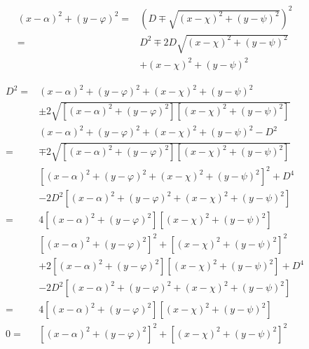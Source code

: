 \documentclass[
]{book}
\theoremstyle{definition}
\theoremstyle{definition}
\theoremstyle{definition}
\theoremstyle{definition}
\theoremstyle{remark}
\begin{document}
\[
\begin{aligned}
\left(x-\alpha\right)^{2}+\left(y-\varphi\right)^{2}= & \left(D\mp\sqrt{\left(x-\chi\right)^{2}+\left(y-\psi\right)^{2}}\right)^{2}\\
= & D^{2}\mp2D\sqrt{\left(x-\chi\right)^{2}+\left(y-\psi\right)^{2}}\\
 & +\left(x-\chi\right)^{2}+\left(y-\psi\right)^{2}
\end{aligned}
\]

\[
\begin{aligned}
D^{2}= & \left(x-\alpha\right)^{2}+\left(y-\varphi\right)^{2}+\left(x-\chi\right)^{2}+\left(y-\psi\right)^{2}\\
 & \pm2\sqrt{\left[\left(x-\alpha\right)^{2}+\left(y-\varphi\right)^{2}\right]\left[\left(x-\chi\right)^{2}+\left(y-\psi\right)^{2}\right]}\\
 & \left(x-\alpha\right)^{2}+\left(y-\varphi\right)^{2}+\left(x-\chi\right)^{2}+\left(y-\psi\right)^{2}-D^{2}\\
= & \mp2\sqrt{\left[\left(x-\alpha\right)^{2}+\left(y-\varphi\right)^{2}\right]\left[\left(x-\chi\right)^{2}+\left(y-\psi\right)^{2}\right]}\\
 & \left[\left(x-\alpha\right)^{2}+\left(y-\varphi\right)^{2}+\left(x-\chi\right)^{2}+\left(y-\psi\right)^{2}\right]^{2}+D^{4}\\
 & -2D^{2}\left[\left(x-\alpha\right)^{2}+\left(y-\varphi\right)^{2}+\left(x-\chi\right)^{2}+\left(y-\psi\right)^{2}\right]\\
= & 4\left[\left(x-\alpha\right)^{2}+\left(y-\varphi\right)^{2}\right]\left[\left(x-\chi\right)^{2}+\left(y-\psi\right)^{2}\right]\\
 & \left[\left(x-\alpha\right)^{2}+\left(y-\varphi\right)^{2}\right]^{2}+\left[\left(x-\chi\right)^{2}+\left(y-\psi\right)^{2}\right]^{2}\\
 & +2\left[\left(x-\alpha\right)^{2}+\left(y-\varphi\right)^{2}\right]\left[\left(x-\chi\right)^{2}+\left(y-\psi\right)^{2}\right]+D^{4}\\
 & -2D^{2}\left[\left(x-\alpha\right)^{2}+\left(y-\varphi\right)^{2}+\left(x-\chi\right)^{2}+\left(y-\psi\right)^{2}\right]\\
= & 4\left[\left(x-\alpha\right)^{2}+\left(y-\varphi\right)^{2}\right]\left[\left(x-\chi\right)^{2}+\left(y-\psi\right)^{2}\right]\\
0= & \left[\left(x-\alpha\right)^{2}+\left(y-\varphi\right)^{2}\right]^{2}+\left[\left(x-\chi\right)^{2}+\left(y-\psi\right)^{2}\right]^{2}\\

\end{aligned}\]
\end{document}
